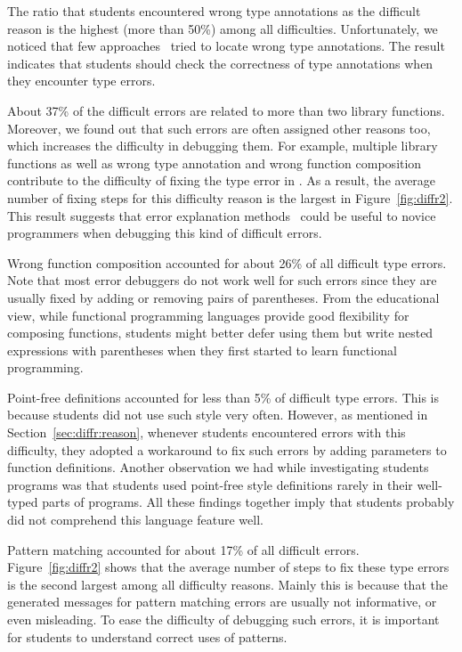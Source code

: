 \documentclass[12pt]{report}	%
\begin{document}
The ratio that students
encountered wrong type annotations as
the difficult reason
is the highest (more than 50\%) among all difficulties.
Unfortunately, we noticed that few 
approaches~\cite{chen2014let} tried
to locate wrong type annotations.
The result indicates that students should check
the correctness of type annotations when they encounter type errors.

About 37\% of the difficult errors are related 
to more than two library functions.
Moreover, we found out that such errors are often assigned
other reasons too, which increases the difficulty in debugging them.
For example, multiple library functions as well as
wrong type annotation and wrong function composition
contribute to the difficulty of fixing
the type error in .
As a result, the average number of fixing steps
for this difficulty reason is the largest in Figure~\ref{fig:diffr2}.
This result suggests that error explanation 
methods~\cite{Chitil01:CET}
could be useful to novice programmers
when debugging this kind of difficult errors.

Wrong function composition accounted for
about 26\% of all difficult type errors.
Note that most error debuggers do not work well
for such errors since they are usually fixed
by adding or removing pairs of parentheses. 
From the educational view,
while functional programming languages provide
good flexibility for composing functions,
students might
better defer using them but write nested expressions
with parentheses 
when they first started to learn 
functional programming.

Point-free definitions accounted for 
less than 5\% of difficult type errors.
%
This is because students did not use such style
very often. However, as mentioned in 
Section~\ref{sec:diffr:reason}, whenever students
encountered errors with this difficulty, they adopted a workaround to fix
such errors by adding parameters to function
definitions. 
%
Another observation we had while investigating
students programs was that students used point-free
style definitions rarely in their well-typed
parts of programs. 
%
All these findings together imply that students probably did not
comprehend this language feature well.

Pattern matching accounted for about 17\% of all difficult
errors. 
Figure~\ref{fig:diffr2} shows that the average number of steps 
to fix these type errors is the second largest among 
all difficulty reasons.
Mainly this is because that
the generated messages for pattern matching errors
are usually not informative, or even misleading.
To ease the difficulty of debugging such errors,
it is important for students to understand 
correct uses of patterns.
\end{document}
